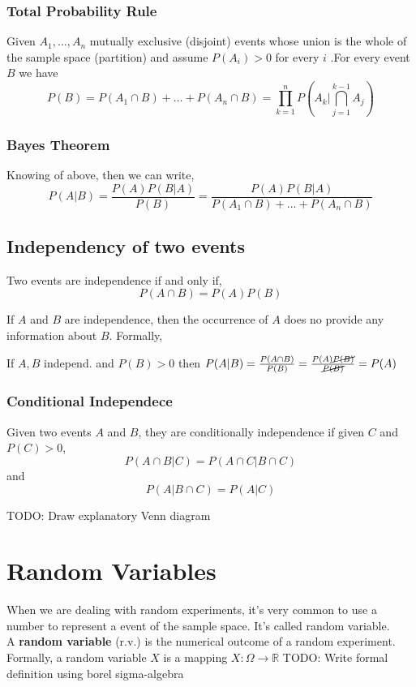 \subsubsection{Total Probability Rule}
Given $A_1,\dots,A_n$ mutually exclusive (disjoint) events whose union is the whole of the sample space (partition) and assume $P(A_i) > 0$ for every $i$ .For every 
event $B$ we have
\[ P(B) = P(A_1\cap B) + \dots + P(A_n \cap B) = \prod_{k=1}^{n}P(A_k|\bigcap_{j=1}^{k-1}A_j)\]

\subsubsection{Bayes Theorem}
Knowing of above, then we can write,
\[ P(A|B) = \frac{P(A)P(B|A)}{P(B)} =  \frac{P(A)P(B|A)}{P(A_1\cap B) + \dots + P(A_n \cap B)}\]

\subsection{Independency of two events}
Two events are independence if and only if,
\[ P(A\cap B) = P(A)P(B)\]

If $A$ and $B$ are independence, then the occurrence of $A$ does no provide any information about $B$. Formally,
\begin{center}
    If $A, B$ independ. and $P(B)>0$ then $P(A|B) = \frac{P(A\cap B)}{P(B)} = \frac{P(A)\cancel{P(B)}}{\cancel{P(B)}} = P(A)$
\end{center}

\subsubsection{Conditional Independece}
Given two events $A$ and $B$, they are conditionally independence if given $C$ and $P(C)>0$, 
\[ P(A\cap B|C) = P(A\cap C|B\cap C) \]
and
\[ P(A|B\cap C) = P(A|C)\]

TODO: Draw explanatory Venn diagram 

\section{Random Variables}
When we are dealing with random experiments, it's very common to use a number to represent a event of the sample space. It's called 
random variable.\\

A \textbf{random variable} (r.v.) is the numerical outcome of a random experiment. Formally, a random variable $X$ is a mapping
$X: \Omega \rightarrow \mathbb{R}$ TODO: Write formal definition using borel sigma-algebra

